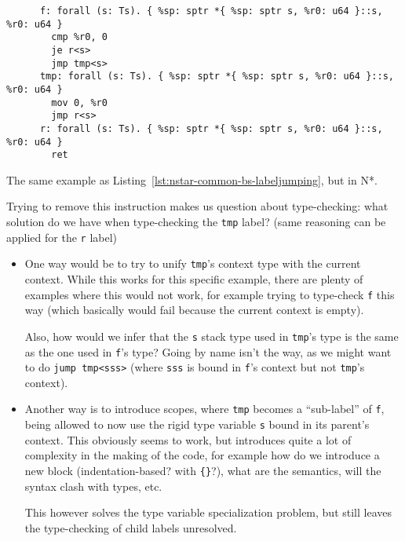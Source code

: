 \begin{listing}[htb]
  \centering
  \begin{minipage}{0.90\textwidth}
    \begin{verbatim}
      f: forall (s: Ts). { %sp: sptr *{ %sp: sptr s, %r0: u64 }::s, %r0: u64 }
        cmp %r0, 0
        je r<s>
        jmp tmp<s>
      tmp: forall (s: Ts). { %sp: sptr *{ %sp: sptr s, %r0: u64 }::s, %r0: u64 }
        mov 0, %r0
        jmp r<s>
      r: forall (s: Ts). { %sp: sptr *{ %sp: sptr s, %r0: u64 }::s, %r0: u64 }
        ret
    \end{verbatim}
  \end{minipage}
  \caption{The same example as Listing~\ref{lst:nstar-common-bs-labeljumping}, but in N*.}
  \label{lst:nstar-common-bs-labeljumping2}
\end{listing}

Trying to remove this instruction makes us question about type-checking: what solution do we have when type-checking the \texttt{tmp} label? (same reasoning can be applied for the \texttt{r} label)
\begin{itemize}
  \item
        One way would be to try to unify \texttt{tmp}'s context type with the current context.
        While this works for this specific example, there are plenty of examples where this would not work, for example trying to type-check \texttt{f} this way (which basically would fail because the current context is empty).

        Also, how would we infer that the \texttt{s} stack type used in \texttt{tmp}'s type is the same as the one used in \texttt{f}'s type?
        Going by name isn't the way, as we might want to do \texttt{jump tmp<sss>} (where \texttt{sss} is bound in \texttt{f}'s context but not \texttt{tmp}'s context).
  \item
        Another way is to introduce scopes, where \texttt{tmp} becomes a ``sub-label'' of \texttt{f}, being allowed to now use the rigid type variable \texttt{s} bound in its parent's context.
        This obviously seems to work, but introduces quite a lot of complexity in the making of the code, for example how do we introduce a new block (indentation-based? with \texttt{\{\}}?), what are the semantics, will the syntax clash with types, etc.

        This however solves the type variable specialization problem, but still leaves the type-checking of child labels unresolved.
\end{itemize}

